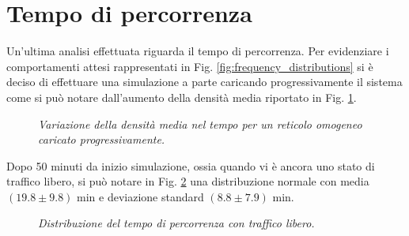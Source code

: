 \documentclass[../main.tex]{subfiles}
\begin{document}
\section{Tempo di percorrenza}
Un'ultima analisi effettuata riguarda il tempo di percorrenza.
Per evidenziare i comportamenti attesi rappresentati in Fig. \ref{fig:frequency_distributions} si \`e deciso di effettuare una simulazione a parte caricando progressivamente il sistema come si pu\`o notare dall'aumento della densit\`a media riportato in Fig. \ref{fig:density_travel_time}.
\begin{figure}[H]
    \centering
    \caption[Distribuzione della densit\`a media per un reticolo omogeneo caricato progressivamente]{\emph{Variazione della densit\`a media nel tempo per un reticolo omogeneo caricato progressivamente.}}
    \label{fig:density_travel_time}
\end{figure}
Dopo 50 minuti da inizio simulazione, ossia quando vi \`e ancora uno stato di traffico libero, si pu\`o notare in Fig. \ref{fig:frequency_free_flow} una distribuzione normale con media $(19.8 \pm 9.8)$ min e deviazione standard $(8.8 \pm 7.9)$ min.
\begin{figure}[H]
    \centering
    \caption[Distribuzione del tempo di percorrenza con traffico libero]{\emph{Distribuzione del tempo di percorrenza con traffico libero.}}
    \label{fig:frequency_free_flow}
\end{figure}
\end{document}
